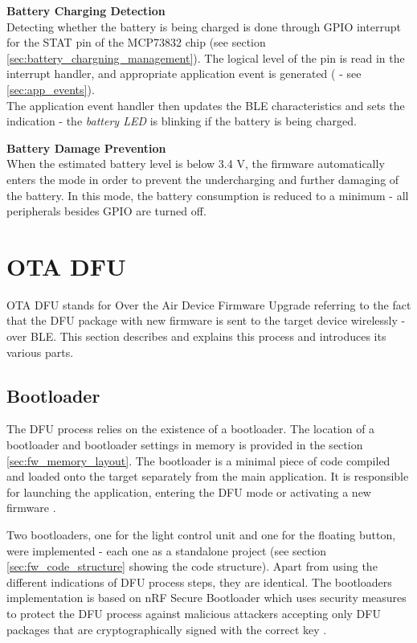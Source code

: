          
        \textbf{Battery Charging Detection}\\
        Detecting whether the battery is being charged is done through GPIO interrupt for the STAT pin of the MCP73832 chip (see section \ref{sec:battery_chargning_management}). The logical level of the pin is read in the interrupt handler, and appropriate application event is generated ( - see \ref{sec:app_events}).\\
        The application event handler then updates the BLE characteristics and sets the indication - the \textit{battery LED} is blinking if the battery is being charged.
        
        
        \textbf{Battery Damage Prevention}\\
        When the estimated battery level is below 3.4 V, the firmware automatically enters the  mode in order to prevent the undercharging and further damaging of the battery. In this mode, the battery consumption is reduced to a minimum - all peripherals besides GPIO are turned off.
        
    
    
\section{OTA DFU} 
    \label{sec:ota}
    OTA DFU stands for Over the Air Device Firmware Upgrade referring to the fact that the DFU package with new firmware is sent to the target device wirelessly - over BLE. This section describes and explains this process and introduces its various parts.
    
    \subsection{Bootloader}
        The DFU process relies on the existence of a bootloader. The location of a bootloader and bootloader settings in memory is provided in the section \ref{sec:fw_memory_layout}. The bootloader is a minimal piece of code compiled and loaded onto the target separately from the main application. It is responsible for launching the application, entering the DFU mode or activating a new firmware \cite{nrf52doc:bootloader}.
        
        Two bootloaders, one for the light control unit and one for the floating button, were implemented - each one as a standalone project (see section \ref{sec:fw_code_structure} showing the code structure). Apart from using the different indications of DFU process steps, they are identical.
        The bootloaders implementation is based on nRF Secure Bootloader which uses security measures to protect the DFU process against malicious attackers accepting only DFU packages that are cryptographically signed with the correct key \cite{nrf52doc:secure_bootloader}.


